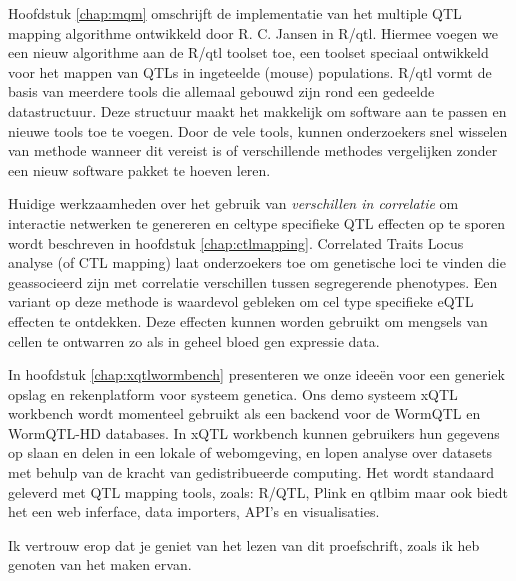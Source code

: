 Hoofdstuk \ref{chap:mqm} omschrijft de implementatie van het multiple QTL mapping algorithme ontwikkeld door 
R. C. Jansen in R/qtl. Hiermee voegen we een nieuw algorithme aan de R/qtl toolset toe, een 
toolset speciaal ontwikkeld voor het mappen van QTLs in ingeteelde (mouse) populations. R/qtl 
vormt de basis van meerdere tools die allemaal gebouwd zijn rond een gedeelde datastructuur. 
Deze structuur maakt het makkelijk om software aan te passen en nieuwe tools toe te voegen.
Door de vele tools, kunnen onderzoekers snel wisselen van methode wanneer dit vereist is of 
verschillende methodes vergelijken zonder een nieuw software pakket te hoeven leren.

Huidige werkzaamheden over het gebruik van \emph{verschillen in correlatie} om interactie 
netwerken te genereren en celtype specifieke QTL effecten op te sporen wordt beschreven in 
hoofdstuk \ref{chap:ctlmapping}. Correlated Traits Locus analyse (of CTL mapping) laat 
onderzoekers toe om genetische loci te vinden die geassocieerd zijn met correlatie verschillen 
tussen segregerende phenotypes. Een variant op deze methode is waardevol gebleken om cel 
type specifieke eQTL effecten te ontdekken. Deze effecten kunnen worden gebruikt om mengsels 
van cellen te ontwarren zo als in geheel bloed gen expressie data.

In hoofdstuk \ref{chap:xqtlwormbench} presenteren we onze idee\"en voor een generiek opslag en rekenplatform 
voor systeem genetica. Ons demo systeem xQTL workbench wordt momenteel gebruikt als een 
backend voor de WormQTL en WormQTL-HD databases. In xQTL workbench kunnen gebruikers hun 
gegevens op slaan en delen in een lokale of webomgeving, en lopen analyse over datasets met 
behulp van de kracht van gedistribueerde computing. Het wordt standaard geleverd met QTL 
mapping tools, zoals: R/QTL, Plink en qtlbim maar ook biedt het een web inferface, data 
importers, API's en visualisaties.

Ik vertrouw erop dat je geniet van het lezen van dit proefschrift, zoals ik heb genoten van het maken 
ervan.

\newpage

